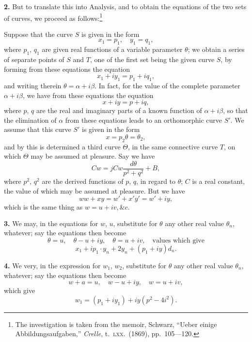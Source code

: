 \documentclass[11pt,a4paper]{book}
\begin{document}
\textbf{2.} But to translate this into Analysis, and to obtain the equations of the two sets of curves, we proceed as follows:\footnote{The investigation is taken from the memoir, Schwarz, ``Ueber einige Abbildungsaufgaben,'' \textit{Crelle}, t.\ \textsc{lxx}.\ (1869), pp.\ 105---120.}

Suppose that the curve $S$ is given in the form
\[
x_1 = p_1, \quad y_1 = q_1,
\]
where $p_1$, $q_1$ are given real functions of a variable parameter $\theta$; we obtain a series of separate points of $S$ and $T$, one of the first set being the given curve $S$, by forming from these equations the equation
\[
x_1 + iy_1 = p_1 + iq_1,
\]
and writing therein $\theta = \alpha + i\beta$. In fact, for the value of the complete parameter $\alpha + i\beta$, we have from these equations the equation
\[
x + iy = p + iq,
\]
where $p$, $q$ are the real and imaginary parts of a known function of $\alpha + i\beta$, so that the elimination of $\alpha$ from these equations leads to an orthomorphic curve $S'$. We assume that this curve $S'$ is given in the form
\[
x = p_2 \theta = \theta_2,
\]
and by this is determined a third curve $\Theta$, in the same connective curve $T$, on which $\Theta$ may be assumed at pleasure. Say we have
\[
Cw = j Cw \frac{d\theta}{p^2 + q^2} + B,
\]
where $p^2$, $q^2$ are the derived functions of $p$, $q$, in regard to $\theta$; $C$ is a real constant, the value of which may be assumed at pleasure. But we have
\[
ww + xy = w' + x'y' = w' + iy,
\]
which is the same thing as $w = u + iv$,\,$\&c.$

\textbf{3.} We may, in the equations for $w$, $u$, substitute for $\theta$ any other real value $\theta_n$, whatever; say the equations then become
\[
\theta = u, \quad \theta - u + iy, \quad \theta = u + iv, \quad \text{values which give}
\]
\[
x_1 + ip_1 \cdot y_n + 2y_n + (p_1 + iy)d_n.
\]

\textbf{4.} We very, in the expression for $w_1$, $w_2$, substitute for $\theta$ any other real value $\theta_n$, whatever; say the equations then become
\[
w + a = u, \quad w - u + iy, \quad w = u + iv,
\]
which give
\[
w_1 = (p_1 + iy_1) + iy(p^2 - 4i^2).
\]
\end{document}
